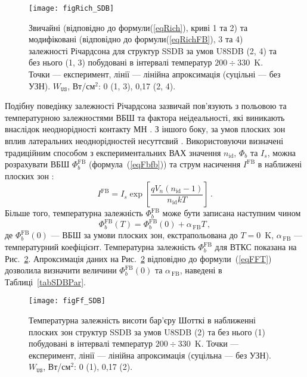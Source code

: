 \begin{figure}
\center
\texttt{[image: figRich\_SDB]}
\caption{\label{figRich_SDB}
Звичайні (відповідно до формули(\ref{eqRich}), криві 1 та 2)
та модифіковані (відповідно до формули(\ref{eqRichFB}), 3 та 4)
залежності Річардсона для структур SSDB за умов U8SDB (2, 4) та без нього (1, 3) побудовані в інтервалі
температур $200\div330$~K.
Точки --- експеримент, лінії --- лінійна апроксимація (суцільні --- без УЗН).
$W_\mathtt{US}$,  Вт/см$^2$: 0 (1, 3), 0,17 (2, 4).
}%
\end{figure}

Подібну поведінку залежності Річардсона зазвичай пов'язують з польовою та температурною залежностями ВБШ та фактора неідеальності,
які виникають внаслідок неоднорідності контакту МН \cite{Sarpatwari,Aldemir}.
З іншого боку, за умов плоских зон вплив латеральних неоднорідностей несуттєвий \cite{Aldemir,Unewisse,Korkut}.
Використовуючи визначені традиційним способом з експериментальних ВАХ значення $n_\mathrm{id}$, $\Phi_b$ та $I_s$,
можна розрахувати ВБШ $\Phi_{b}^\mathrm{FB}$ (формула~(\ref{eqFbfb})) та струм насичення $I^\mathrm{FB}$ в наближені плоских зон \cite{Aldemir,Unewisse,Korkut}:
\begin{equation}\label{eqIfb}
I^\mathrm{FB}=I_s\exp\left[\frac{qV_n(n_\mathrm{id}-1)}{n_\mathrm{id}kT}\right]\,.
\end{equation}
Більше того, температурна залежність $\Phi_{b}^\mathrm{FB}$ може бути записана наступним чином
\begin{equation}
\label{eqFFT}
\Phi_{b}^\mathrm{FB}(T)=\Phi_{b}^\mathrm{FB}(0)+\alpha_\mathrm{\,FB} T \,,
\end{equation}
де
$\Phi_{b}^\mathrm{FB}(0)$ --- ВБШ за умови плоских зон, екстрапольована до $T = 0$~K,
$\alpha_\mathrm{\,FB}$ --- температурний коефіцієнт.
Температурна залежність $\Phi_{b}^\mathrm{FB}$ для ВТКС показана на Рис.~\ref{figFf_SDB}.
Апроксимація даних на Рис.~\ref{figFf_SDB} відповідно до формули~(\ref{eqFFT}) дозволила
визначити величини  $\Phi_{b}^\mathrm{FB}(0)$ та $\alpha_\mathrm{\,FB}$,
наведені в Таблиці~\ref{tabSDBPar}.


\begin{figure}
\center
\texttt{[image: figFf\_SDB]}
\caption{\label{figFf_SDB}
Температурна залежність висоти бар'єру Шотткі в наближенні плоских зон
структур SSDB за умов U8SDB (2) та без нього (1) побудовані в інтервалі
температур $200\div330$~K.
Точки --- експеримент, лінії --- лінійна апроксимація (суцільна --- без УЗН).
$W_\mathtt{US}$,  Вт/см$^2$: 0 (1), 0,17 (2).
}%
\end{figure}


